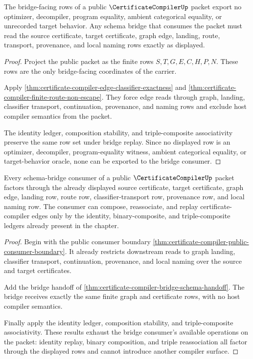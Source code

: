 \begin{theorem}
\label{thm:certificate-compiler-bridge-rows-nonescape}
The bridge-facing rows of a public $\CertificateCompilerUp$ packet export no optimizer, decompiler, program equality, ambient categorical equality, or unrecorded target behavior. Any schema bridge that consumes the packet must read the source certificate, target certificate, graph edge, landing, route, transport, provenance, and local naming rows exactly as displayed.
\end{theorem}
\begin{proof}
Project the public packet as the finite rows $S,T,G,E,C,H,P,N$. These rows are the only bridge-facing coordinates of the carrier.

Apply \autoref{thm:certificate-compiler-edge-classifier-exactness} and \autoref{thm:certificate-compiler-finite-route-non-escape}. They force edge reads through graph, landing, classifier transport, continuation, provenance, and naming rows and exclude host compiler semantics from the packet.

The identity ledger, composition stability, and triple-composite associativity preserve the same row set under bridge replay. Since no displayed row is an optimizer, decompiler, program-equality witness, ambient categorical equality, or target-behavior oracle, none can be exported to the bridge consumer.
\end{proof}

\begin{theorem}
\label{thm:certificate-compiler-bridge-consumer-exhaustion}
Every schema-bridge consumer of a public $\CertificateCompilerUp$ packet factors through the already displayed source certificate, target certificate, graph edge, landing row, route row, classifier-transport row, provenance row, and local naming row. The consumer can compose, reassociate, and replay certificate-compiler edges only by the identity, binary-composite, and triple-composite ledgers already present in the chapter.
\end{theorem}
\begin{proof}
Begin with the public consumer boundary \autoref{thm:certificate-compiler-public-consumer-boundary}. It already restricts downstream reads to graph landing, classifier transport, continuation, provenance, and local naming over the source and target certificates.

Add the bridge handoff of \autoref{thm:certificate-compiler-bridge-schema-handoff}. The bridge receives exactly the same finite graph and certificate rows, with no host compiler semantics.

Finally apply the identity ledger, composition stability, and triple-composite associativity. These results exhaust the bridge consumer's available operations on the packet: identity replay, binary composition, and triple reassociation all factor through the displayed rows and cannot introduce another compiler surface.
\end{proof}

